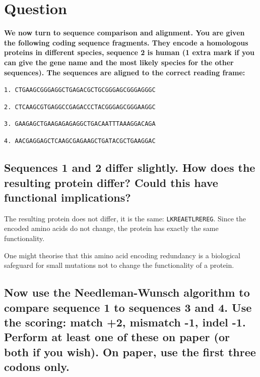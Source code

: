 \section{Question}

\large{\textbf{We now turn to sequence comparison and alignment. You are given the following coding sequence fragments. They encode a homologous proteins in different species, sequence 2 is human (1 extra mark if you can give the gene name and the most likely species for the other sequences). The sequences are aligned to the correct reading frame:}}

\medskip

\texttt{1. CTGAAGCGGGAGGCTGAGACGCTGCGGGAGCGGGAGGGC}

\texttt{2. CTCAAGCGTGAGGCCGAGACCCTACGGGAGCGGGAAGGC}

\texttt{3. GAAGAGCTGAAGAGAGAGGCTGACAATTTAAAGGACAGA}

\texttt{4. AACGAGGAGCTCAAGCGAGAAGCTGATACGCTGAAGGAC}

\medskip


\subsection{Sequences 1 and 2 differ slightly. How does the resulting protein differ? Could this have functional implications?}

The resulting protein does not differ, it is the same: \texttt{LKREAETLREREG}. Since the encoded amino acids do not change, the protein has exactly the same functionality.

One might theorise that this amino acid encoding redundancy is a biological safeguard for small mutations not to change the functionality of a protein.

\medskip


\subsection{Now use the Needleman-Wunsch algorithm to compare sequence 1 to sequences 3 and 4. Use the scoring: match +2, mismatch -1, indel -1. Perform at least one of these on paper (or both if you wish). On paper, use the first three codons only.}

